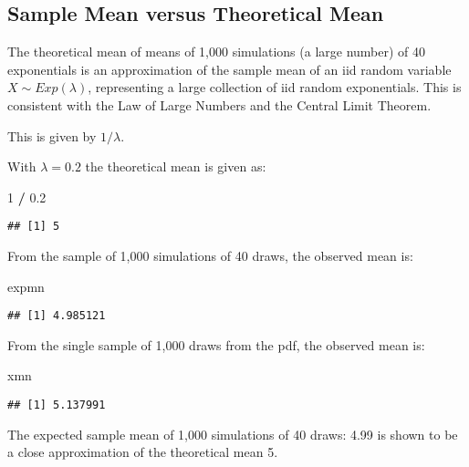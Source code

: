 \documentclass[]{article}
\newenvironment{Shaded}{\begin{snugshade}}{\end{snugshade}}
\newcommand{\DecValTok}[1]{\textcolor[rgb]{0.00,0.00,0.81}{#1}}
\newcommand{\FloatTok}[1]{\textcolor[rgb]{0.00,0.00,0.81}{#1}}
\newcommand{\NormalTok}[1]{#1}
\newcommand{\OperatorTok}[1]{\textcolor[rgb]{0.81,0.36,0.00}{\textbf{#1}}}
\newcommand{\StringTok}[1]{\textcolor[rgb]{0.31,0.60,0.02}{#1}}
\begin{document}
\hypertarget{sample-mean-versus-theoretical-mean}{%
\subsection{Sample Mean versus Theoretical
Mean}\label{sample-mean-versus-theoretical-mean}}

The theoretical mean of means of 1,000 simulations (a large number) of
40 exponentials is an approximation of the sample mean of an iid random
variable \(X \sim Exp(\lambda)\), representing a large collection of iid
random exponentials. This is consistent with the Law of Large Numbers
and the Central Limit Theorem.

This is given by \(1/\lambda\).

With \(\lambda=0.2\) the theoretical mean is given as:

\begin{Shaded}
\begin{Highlighting}[]
\DecValTok{1} \OperatorTok{/}\StringTok{ }\FloatTok{0.2}
\end{Highlighting}
\end{Shaded}

\begin{verbatim}
## [1] 5
\end{verbatim}

From the sample of 1,000 simulations of 40 draws, the observed mean is:

\begin{Shaded}
\begin{Highlighting}[]
\NormalTok{expmn}
\end{Highlighting}
\end{Shaded}

\begin{verbatim}
## [1] 4.985121
\end{verbatim}

From the single sample of 1,000 draws from the pdf, the observed mean
is:

\begin{Shaded}
\begin{Highlighting}[]
\NormalTok{xmn}
\end{Highlighting}
\end{Shaded}

\begin{verbatim}
## [1] 5.137991
\end{verbatim}

The expected sample mean of 1,000 simulations of 40 draws: 4.99 is shown
to be a close approximation of the theoretical mean 5.
\end{document}
